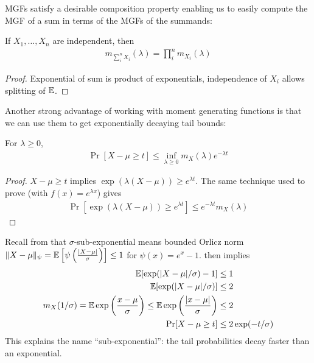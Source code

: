MGFs satisfy a desirable composition property enabling us to easily compute the MGF of a sum in terms
of the MGFs of the summands:
\begin{lemma}\label{lem:mgf-sum-composition}
    If $X_1, \ldots, X_n$ are independent, then
    \begin{align}
        m_{\sum_i^n X_i}(\lambda) = \prod_i^n m_{X_i}(\lambda)
    \end{align}
\end{lemma}
\begin{proof}
    Exponential of sum is product of exponentials, independence of $X_i$ allows splitting
    of $\mathbb{E}$.
\end{proof}

Another strong advantage of working with moment generating functions is that we can use them to
get exponentially decaying tail bounds:

\begin{theorem}\label{thm:chernoff}
    For $\lambda \geq 0$,
    \begin{align}
        \Pr[X - \mu \geq t] \leq \inf_{\lambda \geq 0} m_X(\lambda) e^{-\lambda t}
    \end{align}
\end{theorem}

\begin{proof}
    $X - \mu \geq t$ implies $\exp(\lambda(X - \mu)) \geq e^{\lambda t}$.
    The same technique used to prove  (with $f(x) = e^{\lambda x}$) gives
    \begin{align}
        \Pr[\exp(\lambda (X - \mu)) \geq e^{\lambda t}]
        \leq e^{-\lambda t} m_X(\lambda)
    \end{align}
\end{proof}

\begin{example}\label{eg:sub-exponential-chernoff}
    Recall from  that $\sigma$-sub-exponential means
    bounded Orlicz norm $\|X - \mu\|_\psi = \mathbb{E}\left[\psi\left(\frac{\lvert X - \mu \rvert}{\sigma}\right)\right] \leq 1$
    for $\psi(x) = e^x - 1$.  then implies
    \begin{align}
        \mathbb{E}[\exp(\lvert X - \mu \rvert / \sigma) - 1] &\leq 1\\
        \mathbb{E}[\exp(\lvert X - \mu \rvert / \sigma)] &\leq 2\\
        m_X(1/\sigma)
        = \mathbb{E} \exp\left(\frac{x - \mu}{\sigma}\right)
        \leq \mathbb{E} \exp\left(\frac{\lvert x - \mu \rvert}{\sigma}\right)
        &\leq 2 \\
        \Pr[X - \mu \geq t] &\leq 2 \exp(-t / \sigma)
    \end{align}
    This explains the name ``sub-exponential'': the tail probabilities decay faster than an exponential.
\end{example}


